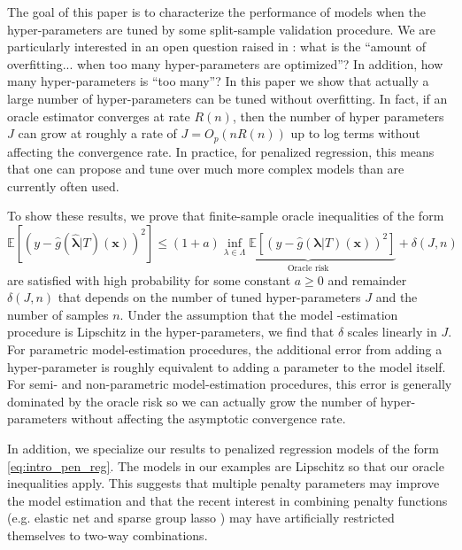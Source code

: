 \documentclass[12pt]{article} %
\theoremstyle{definition}
\begin{document}
The goal of this paper is to characterize the performance of models when the hyper-parameters are tuned by some split-sample validation procedure. We are particularly interested in an open question raised in \citet{bengio2000gradient}: what is the ``amount of overfitting... when too many hyper-parameters are optimized''? In addition, how many hyper-parameters is ``too many''? In this paper we show that actually a large number of hyper-parameters can be tuned without overfitting. In fact, if an oracle estimator converges at rate $R(n)$, then the number of hyper parameters $J$ can grow at roughly a rate of $J = O_p(nR(n))$ up to log terms without affecting the convergence rate. In practice, for penalized regression, this means that one can propose and tune over much more complex models than are currently often used.

To show these results, we prove that finite-sample oracle inequalities of the form
\begin{equation}
\label{thrm:intro_oracle_ineq}
\mathbb{E} \left [
\left ( y - \hat{g}(\hat{\boldsymbol{\lambda}} | T)(\boldsymbol{x}) \right )^2
\right ]
\le
(1+a)
\underbrace{
	\inf_{\lambda \in \Lambda}
	\mathbb{E} \left [
	\left ( y - \hat{g}(\boldsymbol{\lambda} | T)(\boldsymbol{x}) \right )^2
	\right ]
}_{\text{Oracle risk}}
+ \delta \left(J,n\right)
\end{equation}
are satisfied with high probability for some constant $a \ge 0$ and remainder $\delta(J,n)$ that depends on the number of tuned hyper-parameters $J$ and the number of samples $n$.
Under the assumption that the model -estimation procedure is Lipschitz in the hyper-parameters, we find that $\delta$ scales linearly in $J$.
For parametric model-estimation procedures, the additional error from adding a hyper-parameter is roughly equivalent to adding a parameter to the model itself.
For semi- and non-parametric model-estimation procedures, this error is generally dominated by the oracle risk so we can actually grow the number of hyper-parameters without affecting the asymptotic convergence rate.

In addition, we specialize our results to penalized regression models of the form \eqref{eq:intro_pen_reg}.
The models in our examples are Lipschitz so that our oracle inequalities apply.
This suggests that multiple penalty parameters may improve the model estimation and that the recent interest in combining penalty functions (e.g. elastic net and sparse group lasso \citep{zou2003regression, simon2013sparse}) may have artificially restricted themselves to two-way combinations.
\end{document}
